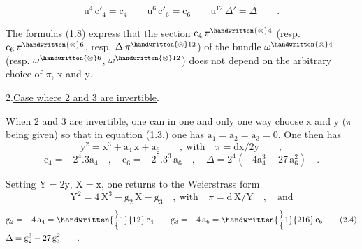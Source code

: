 \[
\mathrm{u}^{4}\,\mathrm{c}'_{4}=\mathrm{c}_{4}\qquad
\mathrm{u}^{6}\,\mathrm{c}'_{6}=\mathrm{c}_{6}\qquad
\mathrm{u}^{12}\,\Delta'=\Delta\qquad.
\tag*{(1.8)}
\]

The formulas (1.8) express that the section $\mathrm{c}_{4}\,\pi^{\handwritten{\otimes}4}$ (resp. $\mathrm{c}_{6}\,\pi^{\handwritten{\otimes}6}$, resp. $\Delta\,\pi^{\handwritten{\otimes}12}$) of the bundle $\omega^{\handwritten{\otimes}4}$ (resp. $\omega^{\handwritten{\otimes}6}$, $\omega^{\handwritten{\otimes}12}$) does not depend on the arbitrary choice of $\pi$, $\mathrm{x}$ and $\mathrm{y}$.
\par\noindent\hfill
{}
\par\vspace{7.7\baselineskip}

2.\qquad \uline{Case where 2 and 3 are invertible}.\margin{\handwritten{$\backslash$}}

When $2$ and $3$ are invertible, one can in one and only one way choose $\mathrm{x}$ and $\mathrm{y}$ ($\pi$ being given) so that in equation (1.3.) one has $\mathrm{a}_{1}=\mathrm{a}_{2}=\mathrm{a}_{3}=0$. One then has
\[
\mathrm{y}^{2}=\mathrm{x}^{3}+\mathrm{a}_{4}\,\mathrm{x}+\mathrm{a}_{6}\qquad,\ \text{with}\quad\pi=\mathrm{dx}/2\mathrm{y}\qquad,
\tag*{(2.1)}
\]
\[
\mathrm{c}_{4}=-2^{4}.3\mathrm{a}_{4}\quad,\quad
\mathrm{c}_{6}=-2^{5}.3^{3}\,\mathrm{a}_{6}\quad,\quad
\Delta=2^{4}(-4\mathrm{a}_{4}^{3}-27\,\mathrm{a}_{6}^{2})\quad.
\tag*{(2.2)}
\]

Setting $\mathrm{Y}=2\mathrm{y}$, $\mathrm{X}=\mathrm{x}$, one returns to the Weierstrass form
\[
\mathrm{Y}^{2}=4\,\mathrm{X}^{3}-\mathrm{g}_{2}\,\mathrm{X}-\mathrm{g}_{3}\quad,\ \text{with}\quad\pi=\mathrm{d}\,\mathrm{X}/\mathrm{Y}\quad,\quad\text{and}
\tag*{(2.3)}
\]
\[
\begin{aligned}[t]
&\mathrm{g}_{2}=-4\,\mathrm{a}_{4}=\handwritten{\frac}{1}{12}\,\mathrm{c}_{4}\qquad
\mathrm{g}_{3}=-4\,\mathrm{a}_{6}=\handwritten{\frac}{1}{216}\,\mathrm{c}_{6}\\
&\Delta=\mathrm{g}_{2}^{3}-27\,\mathrm{g}_{3}^{2}\qquad.
\end{aligned}
\tag*{(2.4)}
\]

